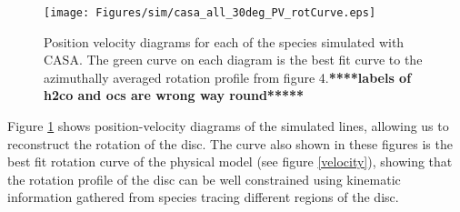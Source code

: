 \documentclass[useAMS,usenatbib]{mn2e}
\begin{document}

%

%

\begin{figure}
 \texttt{[image: Figures/sim/casa\_all\_30deg\_PV\_rotCurve.eps]}
 \caption{Position velocity diagrams for each of the species simulated with CASA. The green curve on each diagram is the best fit curve to the azimuthally averaged rotation profile from figure 4.{\bf *****labels of h2co and ocs are wrong way round*****}}
 \label{pvs}
\end{figure}

Figure \ref{pvs} shows position-velocity diagrams of the simulated lines, allowing us to reconstruct the rotation of the disc. The curve also shown in these figures is the best fit rotation curve of the physical model (see figure \ref{velocity}), showing that the rotation profile of the disc can be well constrained using kinematic information gathered from species tracing different regions of the disc.
\end{document}
